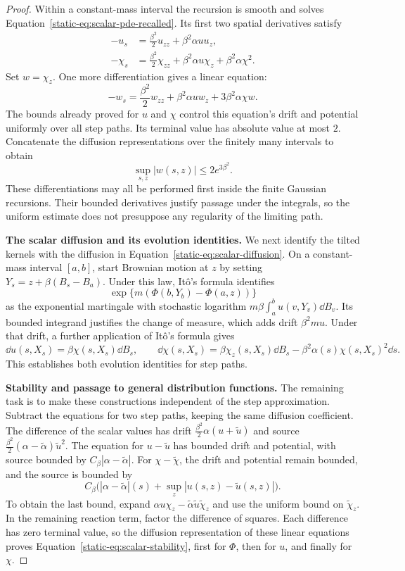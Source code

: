 \begin{proof}
Within a constant-mass interval the recursion is smooth and solves
Equation~\eqref{static-eq:scalar-pde-recalled}. Its first two spatial
derivatives satisfy
\begin{align*}
 -u_s&=\frac{\beta^2}{2}u_{zz}+\beta^2\alpha u u_z,\\
 -\chi_s&=\frac{\beta^2}{2}\chi_{zz}
       +\beta^2\alpha u\chi_z+\beta^2\alpha\chi^2.
\end{align*}
Set $w=\chi_z$. One more differentiation gives a linear equation:
\[
 -w_s=\frac{\beta^2}{2}w_{zz}
       +\beta^2\alpha u w_z+3\beta^2\alpha\chi w.
\]
The bounds already proved for $u$ and $\chi$ control this equation's
drift and potential uniformly over all step paths. Its terminal value
has absolute value at most $2$. Concatenate the diffusion
representations over the finitely many intervals to obtain
\[
 \sup_{s,z}|w(s,z)|\le2e^{3\beta^2}.
\]
These differentiations may all be performed first inside the finite
Gaussian recursions. Their bounded derivatives justify passage under
the integrals, so the uniform estimate does not presuppose any
regularity of the limiting path.

\par\medskip\noindent\textbf{The scalar diffusion and its evolution identities.}\enspace
We next identify the tilted kernels with the diffusion in
Equation~\eqref{static-eq:scalar-diffusion}. On a constant-mass
interval $[a,b]$, start Brownian motion at $z$ by setting
$Y_s=z+\beta(B_s-B_a)$. Under this law, It\^o's formula identifies
\[
 \exp\{m(\Phi(b,Y_b)-\Phi(a,z))\}
\]
as the exponential martingale with stochastic logarithm
$m\beta\int_a^b u(v,Y_v)\dd B_v$. Its bounded integrand justifies
the change of measure, which adds drift $\beta^2m u$. Under that
drift, a further application of It\^o's formula gives
\[
 \dd u(s,X_s)=\beta\chi(s,X_s)\dd B_s,
 \qquad
 \dd\chi(s,X_s)=\beta\chi_z(s,X_s)\dd B_s
                 -\beta^2\alpha(s)\chi(s,X_s)^2\dd s.
\]
This establishes both evolution identities for step paths.

\par\medskip\noindent\textbf{Stability and passage to general distribution functions.}\enspace
The remaining task is to make these constructions independent of the
step approximation. Subtract the equations for two step paths, keeping
the same diffusion coefficient. The difference of the scalar values
has drift $\frac{\beta^2}{2}\alpha(u+\widetilde u)$ and source
$\frac{\beta^2}{2}(\alpha-\widetilde\alpha)\widetilde u^2$.
The equation for $u-\widetilde u$ has bounded drift and potential,
with source bounded by $C_\beta|\alpha-\widetilde\alpha|$.
For $\chi-\widetilde\chi$, the drift and potential remain bounded,
and the source is bounded by
\[
 C_\beta\bigl(|\alpha-\widetilde\alpha|(s)
                 +\sup_z|u(s,z)-\widetilde u(s,z)|\bigr).
\]
To obtain the last bound, expand
$\alpha u\chi_z-\widetilde\alpha\widetilde u\widetilde\chi_z$
and use the uniform bound on $\widetilde\chi_z$. In the remaining
reaction term, factor the difference of squares. Each difference
has zero terminal value, so the diffusion representation of these
linear equations proves Equation~\eqref{static-eq:scalar-stability},
first for $\Phi$, then for $u$, and finally for $\chi$.


\end{proof}
